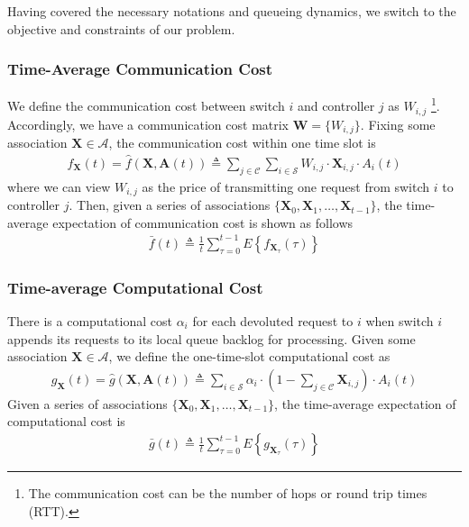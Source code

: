 \documentclass[10pt,journal,compsoc]{IEEEtran}
\begin{document}
Having covered the necessary notations and queueing dynamics, we switch to the objective and constraints of our problem. 

\subsubsection{Time-Average Communication Cost}

We define the communication cost between switch $i$ and controller $j$ as $W_{i,j}$ \footnote{The communication cost can be the number of hops or round trip times (RTT).}. Accordingly, we have a communication cost matrix $\mathbf{W}=\{W_{i,j}\}$. Fixing some association $\mathbf{X} \in \mathcal{A}$, the communication cost within one time slot is
\begin{equation}\label{def-commcost}
	\begin{array}{cl}
		\displaystyle f_{\mathbf{X}}(t) = \hat{f}(\mathbf{X}, \mathbf{A}(t)) \triangleq \sum_{j \in \mathcal{C}} \sum_{i \in \mathcal{S}} W_{i,j} \cdot \mathbf{X}_{i,j} \cdot A_i(t)
	\end{array}
\end{equation}
where we can view $W_{i,j}$ as the price of transmitting one request from switch $i$ to controller $j$. Then, given a series of associations $\{ \mathbf{X}_{0}, \mathbf{X}_{1}, \dots, \mathbf{X}_{t-1} \}$, the time-average expectation of communication cost is shown as follows
\begin{equation}\label{avg-commcost}
	\begin{array}{c}
		\displaystyle \bar{f}(t) \triangleq \frac{1}{t} \sum_{\tau = 0 }^{t - 1} E\left\{f_{\mathbf{X}_{\tau}}(\tau)\right\}
	\end{array}
\end{equation}

\subsubsection{Time-average Computational Cost}

There is a computational cost $\alpha_i$ for each devoluted request to $i$ when switch $i$ appends its requests to its local queue backlog for processing. Given some association $\mathbf{X} \in \mathcal{A}$, we define the one-time-slot computational cost as
\begin{equation}\label{def-offload}
	\begin{array}{cl}
		\displaystyle g_{\mathbf{X}}(t) = \hat{g}(\mathbf{X}, \mathbf{A}(t)) \triangleq \sum_{i \in \mathcal{S}} 
		\alpha_i \cdot \left( 1 - \sum_{j \in \mathcal{C}}  \mathbf{X}_{i,j} \right) \cdot A_i(t)
	\end{array}
\end{equation}
Given a series of associations $\{ \mathbf{X}_{0}, \mathbf{X}_{1}, \dots, \mathbf{X}_{t-1} \}$, the time-average expectation of computational cost is
\begin{equation}\label{avg-offload}
	\begin{array}{c}
		\displaystyle \bar{g}(t) \triangleq \frac{1}{t} \sum_{\tau = 0 }^{t - 1} E\left\{g_{\mathbf{X}_{\tau}}(\tau)\right\}
	\end{array}
\end{equation}
\end{document}
